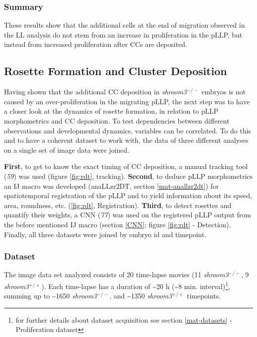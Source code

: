 \documentclass[10pt, b5paper, singlespacinge, twoside]{reedthesis} %
\theoremstyle{definition}
\theoremstyle{definition}
\theoremstyle{definition}
\theoremstyle{remark}
\begin{document}
\hypertarget{summary-3}{%
\subsubsection{Summary}\label{summary-3}}

These results show that the additional cells at the end of migration observed in the LL analysis do not stem from an increase in proliferation in the pLLP, but instead from increased proliferation after CCs are deposited.

\hypertarget{rosette-formation-and-cluster-deposition}{%
\subsection{Rosette Formation and Cluster Deposition}\label{rosette-formation-and-cluster-deposition}}

Having shown that the additional CC deposition in \emph{shroom3}\(^{-/-}\) embryos is not caused by an over-proliferation in the migrating pLLP, the next step was to have a closer look at the dynamics of rosette formation, in relation to pLLP morphometrics and CC deposition. To test dependencies between different observations and developmental dynamics, variables can be correlated. To do this and to have a coherent dataset to work with, the data of three different analyses on a single set of image data were joined.

\textbf{First}, to get to know the exact timing of CC deposition, a manual tracking tool (\emph{59}) was used (figure \ref{fig:rdt}, tracking). \textbf{Second}, to deduce pLLP morphometrics an IJ macro was developed (anaLLzr2DT, section \ref{mat-anallzr2dt}) for spatiotemporal registration of the pLLP and to yield information about its speed, area, roundness, etc. (\ref{fig:rdt}, Registration). \textbf{Third}, to detect rosettes and quantify their weights, a CNN (\emph{77}) was used on the registered pLLP output from the before mentioned IJ macro (section \ref{CNN}; figure \ref{fig:rdt} - Detection).
Finally, all three datasets were joined by embryo id and timepoint.

\hypertarget{res-det-ds}{%
\subsubsection{Dataset}\label{res-det-ds}}

The image data set analyzed consists of 20 time-lapse movies (11 \emph{shroom3}\(^{-/-}\), 9 \emph{shroom3}\(^{+/+}\)). Each time-lapse has a duration of \textasciitilde20 h (\textasciitilde8 min. interval)\footnote{for further details about dataset acquisition see section \ref{mat-datasets} - Proliferation dataset}, summing up to \textasciitilde1650 \emph{shroom3}\(^{-/-}\), and \textasciitilde1350 \emph{shroom3}\(^{+/+}\) timepoints.
\end{document}
